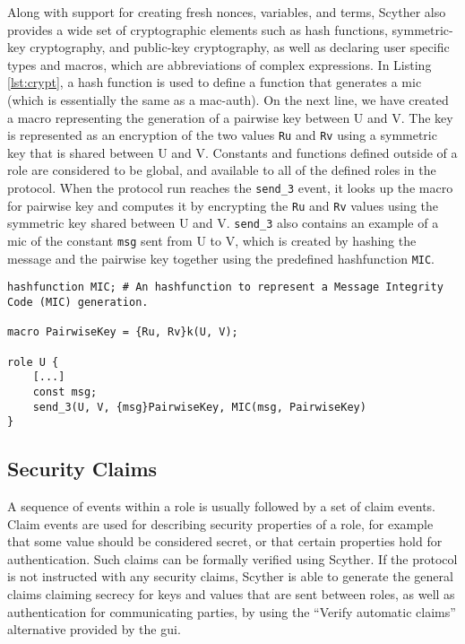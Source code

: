 Along with support for creating fresh nonces, variables, and terms, Scyther also provides a wide set of cryptographic elements such as hash functions, symmetric-key cryptography, and public-key cryptography, as well as declaring user specific types and macros, which are abbreviations of complex expressions. In Listing \ref{lst:crypt}, a hash function is used to define a function that generates a \gls{mic} (which is essentially the same as a \gls{mac-auth}). On the next line, we have created a macro representing the generation of a pairwise key between U and V. The key is represented as an encryption of the two values \texttt{Ru} and \texttt{Rv} using a symmetric key that is shared between U and V. Constants and functions defined outside of a role are considered to be global, and available to all of the defined roles in the protocol. When the protocol run reaches the \texttt{send\_3} event, it looks up the macro for pairwise key and computes it by encrypting the \texttt{Ru} and \texttt{Rv} values using the symmetric key shared between U and V. \texttt{send\_3} also contains an example of a \gls{mic} of the constant \texttt{msg} sent from U to V, which is created by hashing the message and the pairwise key together using the predefined hashfunction \texttt{MIC}.\newline


\begin{lstlisting}[caption={Example on how to use hashfunctions, macros and encryption.}, label={lst:crypt}]
hashfunction MIC; # An hashfunction to represent a Message Integrity Code (MIC) generation.

macro PairwiseKey = {Ru, Rv}k(U, V);

role U {
	[...]
	const msg;
	send_3(U, V, {msg}PairwiseKey, MIC(msg, PairwiseKey)
}
\end{lstlisting}


\subsection{Security Claims}
\label{subsec:claims}

A sequence of events within a role is usually followed by a set of claim events. Claim events are used for describing security properties of a role, for example that some value should be considered secret, or that certain properties hold for authentication. Such claims can be formally verified using Scyther. If the protocol is not instructed with any security claims, Scyther is able to generate the general claims claiming secrecy for keys and values that are sent between roles, as well as authentication for communicating parties, by using the ``Verify automatic claims'' alternative provided by the \gls{gui}.

